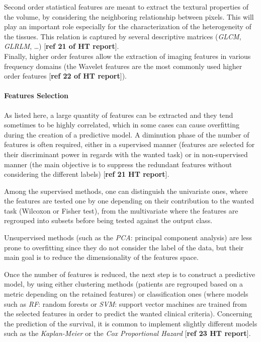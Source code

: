 \documentclass[]{article}
\let\oldparagraph\paragraph
\renewcommand{\paragraph}[1]{\oldparagraph{#1}\mbox{}}
\begin{document}
Second order statistical features are meant to extract the textural
properties of the volume, by considering the neighboring relationship
between pixels. This will play an important role especially for the
characterization of the heterogeneity of the tissues. This relation is
captured by several descriptive matrices (\emph{GLCM}, \emph{GLRLM},
\ldots{}) {[}\textbf{ref 21 of HT report}{]}.\\
Finally, higher order features allow the extraction of imaging features
in various frequency domains (the Wavelet features are the most commonly
used higher order features {[}\textbf{ref 22 of HT report}{]}).

\paragraph{Features Selection}\label{features-selection}

As listed here, a large quantity of features can be extracted and they
tend sometimes to be highly correlated, which in some cases can cause
overfitting during the creation of a predictive model. A diminution
phase of the number of features is often required, either in a
supervised manner (features are selected for their discriminant power in
regards with the wanted task) or in non-supervised manner (the main
objective is to suppress the redundant features without considering the
different labels) {[}\textbf{ref 21 HT report}{]}.

Among the supervised methods, one can distinguish the univariate ones,
where the features are tested one by one depending on their contribution
to the wanted task (Wilcoxon or Fisher test), from the multivariate
where the features are regrouped into subsets before being tested
against the output class.

Unsupervised methods (such as the \emph{PCA}: principal component
analysis) are less prone to overfitting since they do not consider the
label of the data, but their main goal is to reduce the dimensionality
of the features space.

Once the number of features is reduced, the next step is to construct a
predictive model, by using either clustering methods (patients are
regrouped based on a metric depending on the retained features) or
classification ones (where models such as \emph{RF}: random forests or
\emph{SVM}: support vector machines are trained from the selected
features in order to predict the wanted clinical criteria). Concerning
the prediction of the survival, it is common to implement slightly
different models such as the \emph{Kaplan-Meier} or the \emph{Cox
Proportional Hazard} {[}\textbf{ref 23 HT report}{]}.
\end{document}
